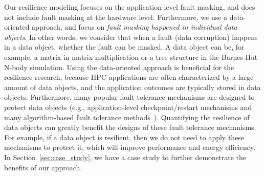 Our resilience modeling focuses on the application-level fault masking, and does not include fault masking at the hardware level. %
Furthermore, we use a data-oriented approach, and focus on \textit{fault masking happened in individual data objects}. 
In other words, we consider that when a fault (data corruption) happens in a data object, whether the fault can be masked.
A data object can be, for example, a matrix in matrix multiplication or a tree structure in the Barnes-Hut N-body simulation.
Using the data-oriented approach is beneficial for the resilience research, because HPC applications
are often characterized by a large amount of data objects, and the application outcomes are typically stored in data objects.
Furthermore, many popular fault tolerance mechanisms are designed to protect data objects (e.g., application-level checkpoint/restart mechanisms
and many algorithm-based fault tolerance methods~\cite{ftcg_ppopp13, ft_lu_hpdc13, jcs13:wu}). Quantifying the resilience of data objects
can greatly benefit the designs of these fault tolerance mechanisms.
For example, if a data object is resilient, then we do not need to apply these mechanisms to protect it, which will improve performance and energy efficiency. In Section~\ref{sec:case_study}, we have a case study to further demonstrate the benefits of our approach.




